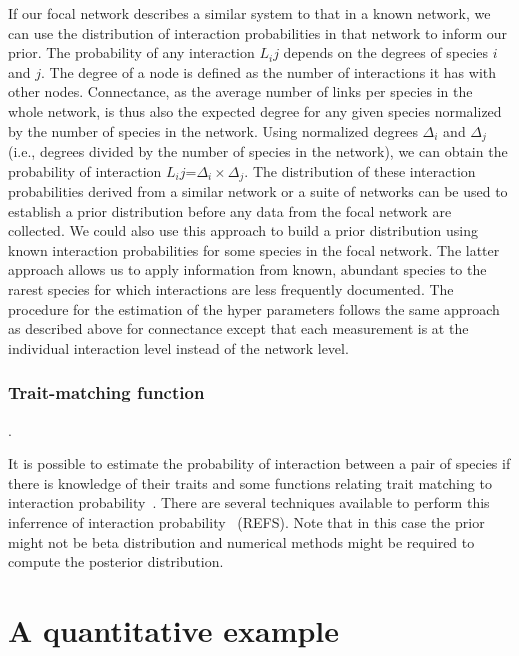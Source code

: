 ﻿\documentclass[12pt]{article}
\begin{document}
         
          If our focal network describes a similar system to that in a known network, we can use the distribution of interaction probabilities in that network to inform our prior. The probability of any interaction $L_ij$ depends on the degrees of species $i$ and $j$. The degree of a node is defined as the number of interactions it has with other nodes. Connectance, as the average number of links per species in the whole network, is thus also the expected degree for any given species normalized by the number of species in the network. Using normalized degrees $\Delta_i$ and $\Delta_j$ (i.e., degrees divided by the number of species in the network), we can obtain the probability of interaction $L_ij$=$\Delta_i\times\Delta_j$. The distribution of these interaction probabilities derived from a similar network or a suite of networks can be used to establish a prior distribution before any data from the focal network are collected. We could also use this approach to build a prior distribution using known interaction probabilities for some species in the focal network. The latter approach allows us to apply information from known, abundant species to the rarest species for which interactions are less frequently documented. The procedure for the estimation of the hyper parameters follows the same approach as described above for connectance except that each measurement is at the individual interaction level instead of the network level.


      \subsubsection*{Trait-matching function}. 

          It is possible to estimate the probability of interaction between a pair of species if there is knowledge of their traits and some functions relating trait matching to interaction probability~\citep{Morales-Castilla2015}. There are several techniques available to perform this inferrence of interaction probability~\citep{} (REFS). Note that in this case the prior might not be beta distribution and numerical methods might be required to compute the posterior distribution.  


\section*{A quantitative example}
\end{document}
